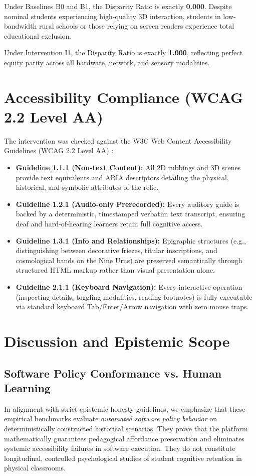 \documentclass[11pt,a4paper]{article}
\begin{document}
Under Baselines B0 and B1, the Disparity Ratio is exactly \textbf{0.000}. Despite nominal students experiencing high-quality 3D interaction, students in low-bandwidth rural schools or those relying on screen readers experience total educational exclusion. 

Under Intervention I1, the Disparity Ratio is exactly \textbf{1.000}, reflecting perfect equity parity across all hardware, network, and sensory modalities.

\section{Accessibility Compliance (WCAG 2.2 Level AA)}

The intervention was checked against the W3C Web Content Accessibility Guidelines (WCAG 2.2 Level AA) \cite{w3c2023wcag}:
\begin{itemize}
    \item \textbf{Guideline 1.1.1 (Non-text Content):} All 2D rubbings and 3D scenes provide text equivalents and ARIA descriptors detailing the physical, historical, and symbolic attributes of the relic.
    \item \textbf{Guideline 1.2.1 (Audio-only Prerecorded):} Every auditory guide is backed by a deterministic, timestamped verbatim text transcript, ensuring deaf and hard-of-hearing learners retain full cognitive access.
    \item \textbf{Guideline 1.3.1 (Info and Relationships):} Epigraphic structures (e.g., distinguishing between decorative friezes, titular inscriptions, and cosmological bands on the Nine Urns) are preserved semantically through structured HTML markup rather than visual presentation alone.
    \item \textbf{Guideline 2.1.1 (Keyboard Navigation):} Every interactive operation (inspecting details, toggling modalities, reading footnotes) is fully executable via standard keyboard Tab/Enter/Arrow navigation with zero mouse traps.
\end{itemize}

\section{Discussion and Epistemic Scope}

\subsection{Software Policy Conformance vs. Human Learning}
In alignment with strict epistemic honesty guidelines, we emphasize that these empirical benchmarks evaluate \textit{automated software policy behavior} on deterministically constructed historical scenarios. They prove that the platform mathematically guarantees pedagogical affordance preservation and eliminates systemic accessibility failures in software execution. They do not constitute longitudinal, controlled psychological studies of student cognitive retention in physical classrooms.
\end{document}
